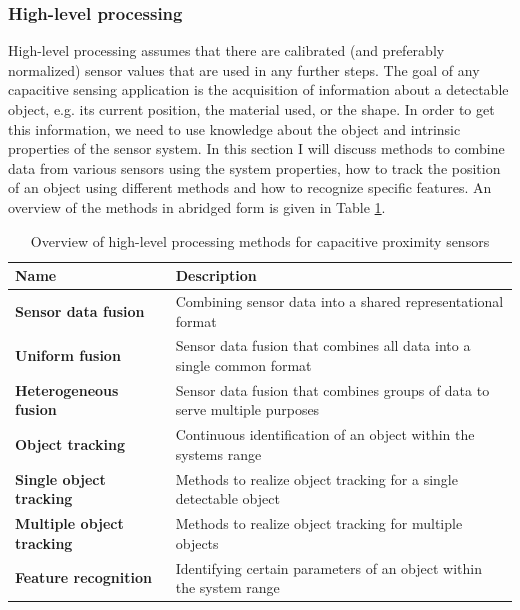 \subsubsection{High-level processing}
High-level processing assumes that there are calibrated (and preferably normalized) sensor values that are used in any further steps. The goal of any capacitive sensing application is the acquisition of information about a detectable object, e.g. its current position, the material used, or the shape. In order to get this information, we need to use knowledge about the object and intrinsic properties of the sensor system. In this section I will discuss methods to combine data from various sensors using the system properties, how to track the position of an object using different methods and how to recognize specific features. An overview of the methods in abridged form is given in Table \ref{tab:rel_highlevel}. 
\begin{table}[htbp]
  \centering
  \caption{Overview of high-level processing methods for capacitive proximity sensors}
    \begin{tabular}{lp{5cm}}
    \toprule
    \textbf{Name} & \textbf{Description} \\
    \midrule
    \textbf{Sensor data fusion} & Combining sensor data into a shared representational format \\ \addlinespace
    \textbf{Uniform fusion} & Sensor data fusion that combines all data into a single common format \\ \addlinespace
    \textbf{Heterogeneous fusion} & Sensor data fusion that combines groups of data to serve multiple purposes \\ \addlinespace
    \textbf{Object tracking } & Continuous identification of an object within the systems range \\ \addlinespace
    \textbf{Single object tracking} & Methods to realize object tracking for a single detectable object \\ \addlinespace
    \textbf{Multiple object tracking} & Methods to realize object tracking for multiple objects \\ \addlinespace
    \textbf{Feature recognition} & Identifying certain parameters of an object within the system range \\
    \bottomrule
    \end{tabular}%
  \label{tab:rel_highlevel}
\end{table}%

